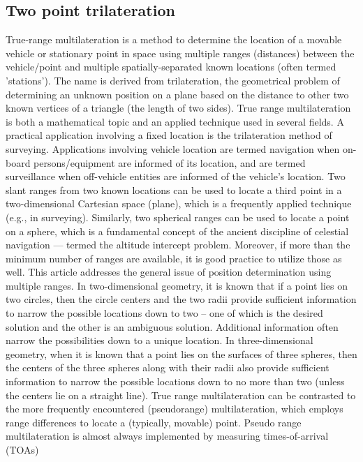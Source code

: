 \subsection{Two point trilateration}
True-range multilateration is a method to determine the location of a movable vehicle or
stationary point in space using multiple ranges (distances) between the vehicle/point and 
multiple spatially-separated known locations (often termed 'stations'). 
The name is derived from trilateration, the geometrical problem of determining an unknown 
position on a plane based on the distance to other two known vertices of a triangle 
(the length of two sides). 
True range multilateration is both a mathematical topic and an applied technique used in several
fields. 
A practical application involving a fixed location is the trilateration method of surveying.
Applications involving vehicle location are termed navigation when on-board persons/equipment are 
informed of its location, and are termed surveillance when off-vehicle entities are informed of 
the vehicle's location.
Two slant ranges from two known locations can be used to locate a third point in a two-dimensional 
Cartesian space (plane), which is a frequently applied technique (e.g., in surveying). 
Similarly, two spherical ranges can be used to locate a point on a sphere, which is a fundamental 
concept of the ancient discipline of celestial navigation — termed the altitude intercept problem.
Moreover, if more than the minimum number of ranges are available, it is good practice to utilize 
those as well. This article addresses the general issue of position determination using multiple 
ranges.
In two-dimensional geometry, it is known that if a point lies on two circles, then the circle 
centers and the two radii provide sufficient information to narrow the possible locations down to 
two – one of which is the desired solution and the other is an ambiguous solution.
Additional information often narrow the possibilities down to a unique location. 
In three-dimensional geometry, when it is known that a point lies on the surfaces of three 
spheres, then the centers of the three spheres along with their radii also provide sufficient 
information to narrow the possible locations down to no more than two (unless the centers lie on 
a straight line).
True range multilateration can be contrasted to the more frequently encountered (pseudorange) 
multilateration, which employs range differences to locate a (typically, movable) point. 
Pseudo range multilateration is almost always implemented by measuring times-of-arrival (TOAs) 
